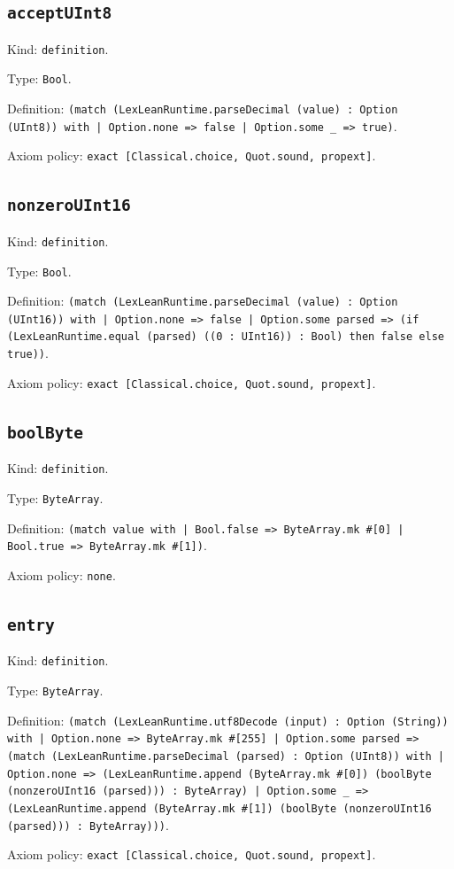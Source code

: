\documentclass[11pt]{article}
\begin{document}
\subsection*{\texttt{acceptUInt8}}
\noindent Kind: \texttt{definition}.\par
\noindent Type: \texttt{Bool}.\par
\noindent Definition: \texttt{(match (LexLeanRuntime.parseDecimal (value) : Option (UInt8)) with | Option.none => false | Option.some \_ => true)}.\par
\noindent Axiom policy: \texttt{exact [Classical.choice, Quot.sound, propext]}.\par
\subsection*{\texttt{nonzeroUInt16}}
\noindent Kind: \texttt{definition}.\par
\noindent Type: \texttt{Bool}.\par
\noindent Definition: \texttt{(match (LexLeanRuntime.parseDecimal (value) : Option (UInt16)) with | Option.none => false | Option.some parsed => (if (LexLeanRuntime.equal (parsed) ((0 : UInt16)) : Bool) then false else true))}.\par
\noindent Axiom policy: \texttt{exact [Classical.choice, Quot.sound, propext]}.\par
\subsection*{\texttt{boolByte}}
\noindent Kind: \texttt{definition}.\par
\noindent Type: \texttt{ByteArray}.\par
\noindent Definition: \texttt{(match value with | Bool.false => ByteArray.mk \#[0] | Bool.true => ByteArray.mk \#[1])}.\par
\noindent Axiom policy: \texttt{none}.\par
\subsection*{\texttt{entry}}
\noindent Kind: \texttt{definition}.\par
\noindent Type: \texttt{ByteArray}.\par
\noindent Definition: \texttt{(match (LexLeanRuntime.utf8Decode (input) : Option (String)) with | Option.none => ByteArray.mk \#[255] | Option.some parsed => (match (LexLeanRuntime.parseDecimal (parsed) : Option (UInt8)) with | Option.none => (LexLeanRuntime.append (ByteArray.mk \#[0]) (boolByte (nonzeroUInt16 (parsed))) : ByteArray) | Option.some \_ => (LexLeanRuntime.append (ByteArray.mk \#[1]) (boolByte (nonzeroUInt16 (parsed))) : ByteArray)))}.\par
\noindent Axiom policy: \texttt{exact [Classical.choice, Quot.sound, propext]}.\par
\end{document}

